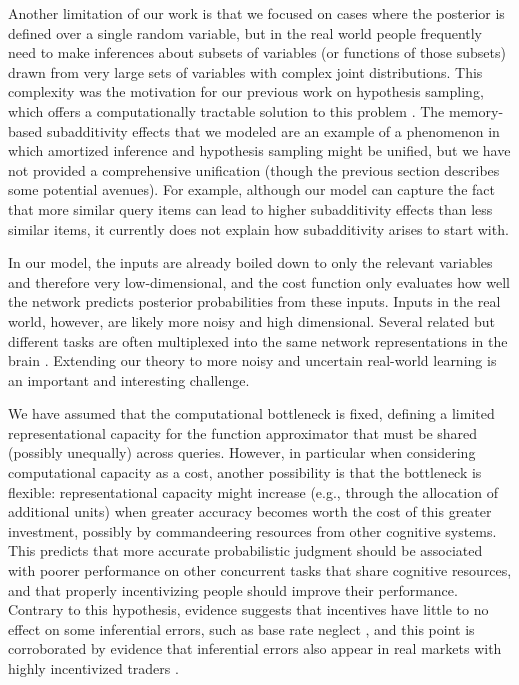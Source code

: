 Another limitation of our work is that we focused on cases where the posterior is defined over a single random variable, but in the real world people frequently need to make inferences about subsets of variables (or functions of those subsets) drawn from very large sets of variables with complex joint distributions. This complexity was the motivation for our previous work on hypothesis sampling, which offers a computationally tractable solution to this problem \citep{dasgupta2017hypotheses}. The memory-based subadditivity effects that we modeled \citep{dasgupta2018remembrance} are an example of a phenomenon in which amortized inference and hypothesis sampling might be unified, but we have not provided a comprehensive unification (though the previous section describes some potential avenues). For example, although our model can capture the fact that more similar query items can lead to higher subadditivity effects than less similar items, it currently does not explain how subadditivity arises to start with.

In our model, the inputs are already boiled down to only the relevant variables and therefore very low-dimensional, and the cost function only evaluates how well the network predicts posterior probabilities from these inputs. Inputs in the real world, however, are likely more noisy and high dimensional. Several related but different tasks are often multiplexed into the same network representations in the brain \citep{alon2017graph, feng2014multitasking}. Extending our theory to more noisy and uncertain real-world learning is an important and interesting challenge.

We have assumed that the computational bottleneck is fixed, defining a limited representational capacity for the function approximator that must be shared (possibly unequally) across queries. However, in particular when considering computational capacity as a cost, another possibility is that the bottleneck is flexible: representational capacity might increase (e.g., through the allocation of additional units) when greater accuracy becomes worth the cost of this greater investment, possibly by commandeering resources from other cognitive systems. This predicts that more accurate probabilistic judgment should be associated with poorer performance on other concurrent tasks that share cognitive resources, and that properly incentivizing people should improve their performance. Contrary to this hypothesis, evidence suggests that incentives have little to no effect on some inferential errors, such as base rate neglect \citep{grether1980bayes,ganguly2000asset,phillips1966conservatism}, and this point is corroborated by evidence that inferential errors also appear in real markets with highly incentivized traders \citep{barberis1998model}.

